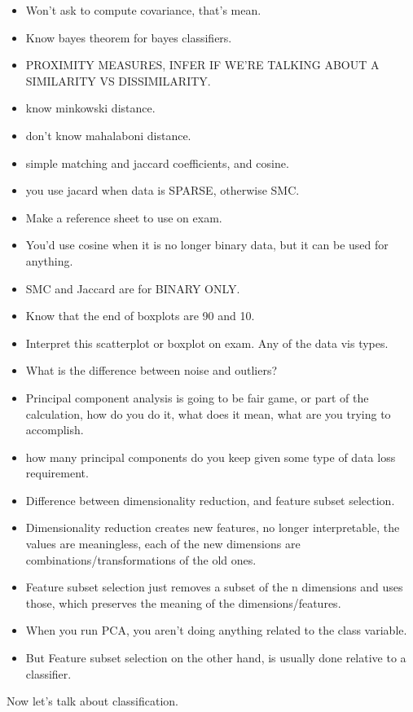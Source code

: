 \documentclass{amsbook}
\theoremstyle{plain}
\theoremstyle{definition}
\theoremstyle{remark}
\begin{document}
\begin{itemize}
\item Won't ask to compute covariance, that's mean. 
\item Know bayes theorem for bayes classifiers. 
\item PROXIMITY MEASURES, INFER IF WE'RE TALKING ABOUT A SIMILARITY VS DISSIMILARITY. 
\item know minkowski distance. 
\item don't know mahalaboni distance. 
\item simple matching and jaccard coefficients, and cosine. 
\item you use jacard when data is SPARSE, otherwise SMC. 
\item Make a reference sheet to use on exam. 
\item You'd use cosine when it is no longer binary data, but it can be used for anything. 
\item SMC and Jaccard are for BINARY ONLY. 
\item Know that the end of boxplots are 90 and 10. 
\item Interpret this scatterplot or boxplot on exam. Any of the data vis types. 
\item What is the difference between noise and outliers?
\item Principal component analysis is going to be fair game, or part of the calculation, how do you do it, what does it mean, what are you trying to accomplish. 
\item how many principal components do you keep given some type of data loss requirement. 
\item Difference between dimensionality reduction, and feature subset selection. 
\item Dimensionality reduction creates new features, no longer interpretable, the values are meaningless, each of the new dimensions are combinations/transformations of the old ones. 
\item Feature subset selection just removes a subset of the n dimensions and uses those, which preserves the meaning of the dimensions/features. 
\item When you run PCA, you aren't doing anything related to the class variable.
\item But Feature subset selection on the other hand, is usually done relative to a classifier. 
\end{itemize}


Now let's talk about classification. 
\end{document}
